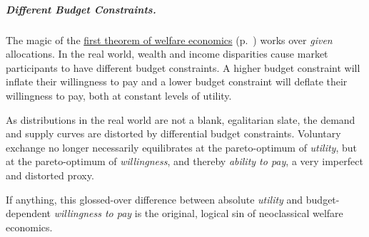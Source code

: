 



\subparagraph{Different Budget Constraints.}  \label{sec:different-budget-constraints} The magic of the \hyperref[fn:1st-theorem]{first theorem of welfare economics} (p.~\pageref{fn:1st-theorem}) works over \emph{given} allocations.
In the real world, wealth and income disparities cause market participants to have different budget constraints.
A higher budget constraint will inflate their willingness to pay and a lower budget constraint will deflate their willingness to pay, both at constant levels of utility.

As distributions in the real world are not a blank, egalitarian slate, the demand and supply curves are distorted by differential budget constraints.
Voluntary exchange no longer necessarily equilibrates at the pareto-optimum of \emph{utility}, but at the pareto-optimum of \emph{willingness}, and thereby \emph{ability to pay}, a very imperfect and distorted proxy.

If anything, this glossed-over difference between absolute \emph{utility} and budget-dependent \emph{willingness to pay} is the original, logical sin of neoclassical welfare economics.

